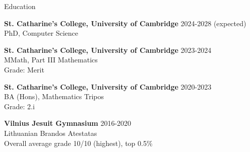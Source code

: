 \documentclass{resume} %
\begin{document}
\begin{rSection}{Education}

{\bf St. Catharine's College, University of Cambridge} \hfill {2024-2028 (expected)} \\
PhD, Computer Science

\vspace{-0.1cm}

{\bf St. Catharine's College, University of Cambridge} \hfill {2023-2024} \\
MMath, Part III Mathematics \\
Grade: Merit


\vspace{-0.1cm}
{\bf St. Catharine's College, University of Cambridge} \hfill {2020-2023} \\ 
BA (Hons), Mathematics Tripos \\
Grade: 2.i

\vspace{-0.1cm}
{\bf Vilnius Jesuit Gymnasium} \hfill {2016-2020} \\
Lithuanian Brandos Atestatas \\
Overall average grade 10/10 (highest), top 0.5\% %
\end{rSection}
\end{document}
